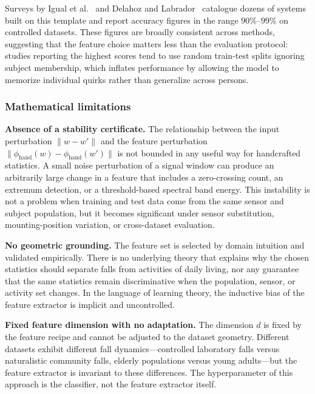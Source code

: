 \documentclass[onluarkali,ingilizce,yukseklisans,karton,LisansustuEgitim]{itutez}
\providecommand{\1}{\mathbf{1}}
\begin{document}
Surveys by Igual et al.~\parencite{igual2013challenges} and Delahoz and
Labrador~\parencite{delahoz2014survey} catalogue dozens of systems built on this
template and report accuracy figures in the range $90\%$--$99\%$ on controlled
datasets.  These figures are broadly consistent across methods, suggesting that
the feature choice matters less than the evaluation protocol: studies reporting
the highest scores tend to use random train-test splits ignoring subject membership,
which inflates performance by allowing the model to memorize individual quirks
rather than generalize across persons.

\subsubsection{Mathematical limitations}

\textbf{Absence of a stability certificate.}  The relationship between the
input perturbation $\|w - w'\|$ and the feature perturbation
$\|\phi_{\mathrm{hand}}(w) - \phi_{\mathrm{hand}}(w')\|$ is not bounded in any
useful way for handcrafted statistics.  A small noise perturbation of a signal
window can produce an arbitrarily large change in a feature that includes a
zero-crossing count, an extremum detection, or a threshold-based spectral band
energy.  This instability is not a problem when training and test data come from
the same sensor and subject population, but it becomes significant under sensor
substitution, mounting-position variation, or cross-dataset evaluation.

\textbf{No geometric grounding.}  The feature set is selected by domain intuition
and validated empirically.  There is no underlying theory that explains why the
chosen statistics should separate falls from activities of daily living, nor any
guarantee that the same statistics remain discriminative when the population,
sensor, or activity set changes.  In the language of learning theory, the
inductive bias of the feature extractor is implicit and uncontrolled.

\textbf{Fixed feature dimension with no adaptation.}  The dimension $d$ is fixed by
the feature recipe and cannot be adjusted to the dataset geometry.  Different
datasets exhibit different fall dynamics---controlled laboratory falls versus
naturalistic community falls, elderly populations versus young adults---but the
feature extractor is invariant to these differences.  The hyperparameter of this
approach is the classifier, not the feature extractor itself.
\end{document}
